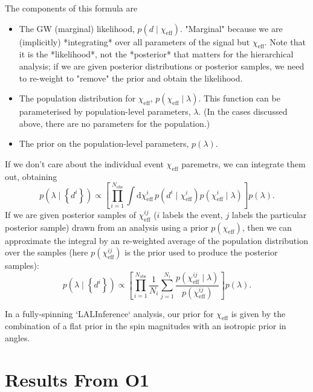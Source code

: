 \documentclass[modern]{aastex61}
\newcommand{\chieff}{\chi_\mathrm{eff}}
\newcommand{\dd}{\mathrm{d}}
\begin{document}
The components of this formula are
\begin{itemize}
\item The GW (marginal) likelihood, $p\left(d \mid \chieff\right)$.
  "Marginal" because we are (implicitly) *integrating* over all
  parameters of the signal but $\chieff$.  Note that it is the
  *likelihood*, not the *posterior* that matters for the hierarchical
  analysis; if we are given posterior distributions or posterior
  samples, we need to re-weight to "remove" the prior and obtain the
  likelihood.
\item The population distribution for $\chieff$,
  $p\left( \chieff \mid \lambda \right)$.  This function can be
  parameterised by population-level parameters, $\lambda$.  (In the
  cases discussed above, there are no parameters for the population.)
\item The prior on the population-level parameters, $p(\lambda)$.
\end{itemize}
If we don't care about the individual event $\chieff$ paremetrs, we
can integrate them out, obtaining
\begin{equation}
  p\left( \lambda \mid \left\{ d^i \right\} \right) \propto \left[ \prod_{i=1}^{N_\mathrm{obs}} \int \dd \chieff^i \, p\left(d^i \mid \chieff^i \right) p\left( \chieff^i \mid \lambda \right) \right] p\left(\lambda\right).
\end{equation}
If we are given posterior samples of $\chieff^{ij}$ ($i$ labels the
event, $j$ labels the particular posterior sample) drawn from an
analysis using a prior $p\left( \chieff \right)$, then we can
approximate the integral by an re-weighted average of the population
distribution over the samples (here $p\left( \chieff^{ij} \right)$ is
the prior used to produce the posterior samples):
\begin{equation}
  p\left( \lambda \mid \left\{ d^i \right\} \right) \propto \left[ \prod_{i=1}^{N_\mathrm{obs}} \frac{1}{N_i} \sum_{j=1}^{N_i} \frac{p\left( \chieff^{ij} \mid \lambda \right)}{p\left( \chieff^{ij} \right)} \right] p\left(\lambda\right).
\end{equation}

In a fully-spinning `LALInference` analysis, our prior for $\chieff$
is given by the combination of a flat prior in the spin magnitudes
with an isotropic prior in angles.

\section{Results From O1}
\label{sec:O1}
\end{document}
